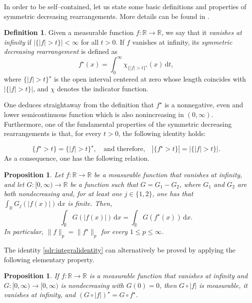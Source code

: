 \documentclass[11pt]{article}
\newcommand{\R}{\mathbb{R}}
\renewcommand{\d}{\,\mathrm{d}}
\theoremstyle{plain}
\newtheorem{proposition}[theorem]{Proposition}
\theoremstyle{definition}
\newtheorem{definition}[theorem]{Definition}
\theoremstyle{remark}
\numberwithin{equation}{section}
\begin{document}
{In order to be self--contained, let us state some basic definitions and properties of symmetric decreasing rearrangements. More details can be found in \cite{Burchard2009,LiebLoss2001}.

\begin{definition} 
	
    Given a measurable function $f:\R\to\R$, we say that it \emph{vanishes at infinity} if $|\{|f|>t\}|<\infty$ for all $t>0$. If $f$ vanishes at infinity, its \emph{symmetric decreasing rearrangement} is defined as
\[f^\star(x)=\int_0^\infty\chi_{\{|f|>t\}^\star}(x)\d t,\]
where $\{|f|>t\}^\star$ is the open interval centered at zero whose length coincides with $|\{|f|>t\}|$, and $\chi$ denotes the indicator function.
\end{definition}
	

One deduces straightaway from the definition that $f^\star$ is a nonnegative, even and lower semicontinuous function which is also nonincreasing in $(0,\infty)$. Furthermore, one of the fundamental properties of the symmetric decreasing rearrangements is that, for every $t>0$,  the following identity holds:


\begin{equation*}
	\{f^\star>t\}=\{|f|>t\}^\star,\quad\text{and therefore,}\quad|\{f^\star>t\}|=|\{|f|>t\}|.
\end{equation*}
As a consequence, one has the following relation.

\begin{proposition}\label{prop:integrals}
Let $f:\R\to\R$ be a measurable function that vanishes at infinity, and let $G:[0,\infty)\to\R$ be a function such that $G=G_1-G_2$, where $G_1$ and $G_2$ are both nondecreasing and, for at least one $j\in\{1,2\}$, one has that $\int_\R G_j(|f(x)|)\d x$ is finite. Then, 
\begin{equation}\label{sdr:integralidentity}
	\int_\R G(|f(x)|)\d x=\int_\R G(f^\star(x))\d x.
\end{equation}
In particular, $\|f\|_p=\|f^\star\|_p$ for every $1\leq p\leq \infty$.
\end{proposition}

The identity \eqref{sdr:integralidentity} can alternatively be proved by applying the following elementary property.

\begin{proposition}\label{prop:compositions}
    If $f:\R\to\R$ is a measurable function that vanishes at infinity and $G:[0,\infty)\to [0,\infty)$ is nondecreasing with $G(0)=0$, then $G\circ |f|$ is measurable, it vanishes at infinity, and $(G\circ |f|)^\star=G\circ f^\star$.
\end{proposition}


}
\end{document}
